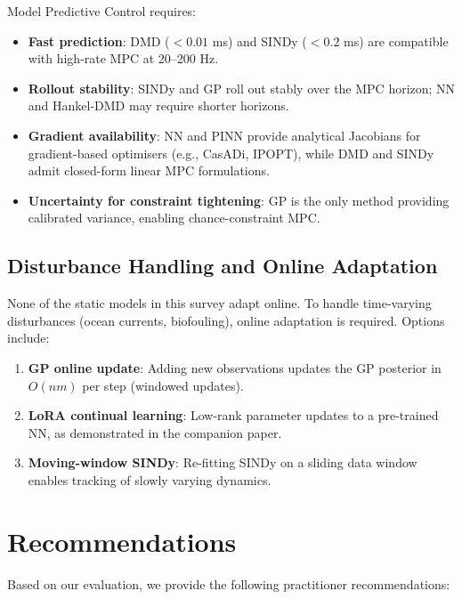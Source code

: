 \documentclass[conference]{IEEEtran}
\begin{document}
Model Predictive Control requires:
\begin{itemize}
  \item \textbf{Fast prediction}: DMD ($<0.01$ ms) and SINDy ($<0.2$ ms)
        are compatible with high-rate MPC at 20–200 Hz.
  \item \textbf{Rollout stability}: SINDy and GP roll out stably over the
        MPC horizon; NN and Hankel-DMD may require shorter horizons.
  \item \textbf{Gradient availability}: NN and PINN provide analytical
        Jacobians for gradient-based optimisers (e.g., CasADi, IPOPT),
        while DMD and SINDy admit closed-form linear MPC formulations.
  \item \textbf{Uncertainty for constraint tightening}: GP is the only
        method providing calibrated variance, enabling chance-constraint MPC.
\end{itemize}

\subsection{Disturbance Handling and Online Adaptation}

None of the static models in this survey adapt online. To handle time-varying
disturbances (ocean currents, biofouling), online adaptation is required.
Options include:
\begin{enumerate}
  \item \textbf{GP online update}: Adding new observations updates the GP
        posterior in $O(nm)$ per step (windowed updates).
  \item \textbf{LoRA continual learning}: Low-rank parameter updates to a
        pre-trained NN, as demonstrated in the companion paper.
  \item \textbf{Moving-window SINDy}: Re-fitting SINDy on a sliding data
        window enables tracking of slowly varying dynamics.
\end{enumerate}

\section{Recommendations}
\label{sec:recommendations}

Based on our evaluation, we provide the following practitioner recommendations:
\end{document}
